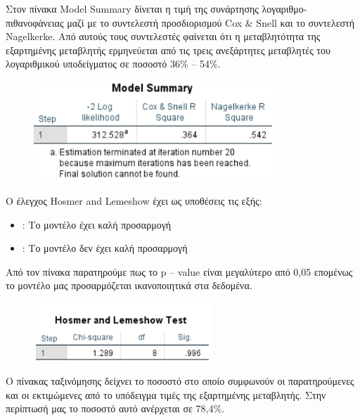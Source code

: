 \vspace{1cm}
Στον πίνακα Model Summary δίνεται η τιμή της συνάρτησης λογαριθμο-πιθανοφάνειας μαζί με το συντελεστή προσδιορισμού Cox \& Snell και το συντελεστή Nagelkerke. Από αυτούς τους συντελεστές φαίνεται ότι η μεταβλητότητα της εξαρτημένης μεταβλητής ερμηνεύεται από τις τρεις ανεξάρτητες μεταβλητές του λογαριθμικού υποδείγματος σε ποσοστό 36\% – 54\%. 

\clearpage

\begin{figure}[ht]
    \centering
    \includegraphics[width=0.8\textwidth]{images/508.PNG}
\end{figure}
\vspace{1cm}
Ο έλεγχος Hosmer and Lemeshow έχει ως υποθέσεις τις εξής:
\begin{itemize}
    \item {} : Το μοντέλο έχει καλή προσαρμογή 
    \item {} : Το μοντέλο δεν έχει καλή προσαρμογή 
\end{itemize}

Από τον πίνακα παρατηρούμε πως το p – value είναι μεγαλύτερο από 0,05 επομένως το μοντέλο μας προσαρμόζεται ικανοποιητικά στα δεδομένα.
\vspace{1cm}

\begin{figure}[h]
    \centering
    \includegraphics[width=0.6\textwidth]{images/509.PNG}
\end{figure}

\vspace{1cm}
Ο πίνακας ταξινόμησης  δείχνει το ποσοστό στο οποίο συμφωνούν οι παρατηρούμενες και οι εκτιμώμενες από το υπόδειγμα τιμές της εξαρτημένης μεταβλητής. Στην περίπτωσή μας το ποσοστό αυτό ανέρχεται σε 78,4\%.

